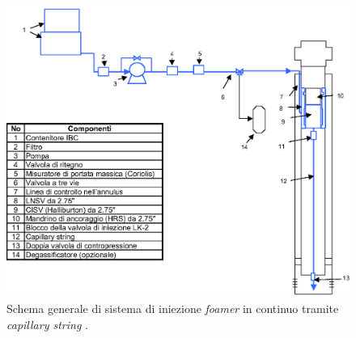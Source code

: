 \begin{figure}[htbp]
    \centering
    \includegraphics[width=\textwidth]{fig/foamer/continuous.eps}
    \caption{Schema generale di sistema di iniezione \textit{foamer} in continuo tramite \textit{capillary string} \parencite{wittfeld2015foam}.}
    \label{fig:continuous}
\end{figure}

